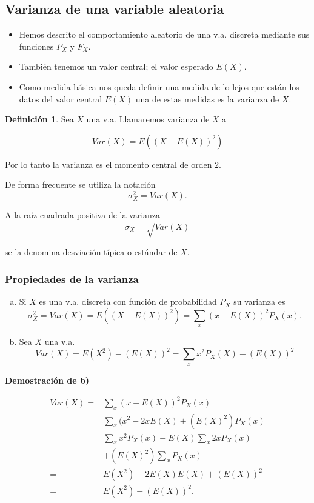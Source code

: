 \documentclass[handout]{beamer}\usepackage[]{graphicx}\usepackage[]{color}
\renewcommand{\emph}[1]{{\color{red}#1}}
\theoremstyle{plain}
\theoremstyle{definition}
\newtheorem{definicion}{Definición}
\begin{document}
\subsection{Varianza de una variable aleatoria}

\begin{frame}


\begin{itemize}
\item Hemos descrito el comportamiento aleatorio de una v.a. discreta mediante sus funciones  $P_{X}$ y
$F_{X}$.
\item También tenemos un valor central; el valor esperado $E(X)$. 
\item Como medida básica nos queda definir una medida de lo lejos que están los datos del valor central $E(X)$ una de estas medidas es la varianza de $X$.
\end{itemize}
\end{frame}

\begin{frame}
\begin{definicion}
    Sea $X$ una v.a. Llamaremos \emph{varianza} de $X$ a

    $$Var(X)=E((X-E(X))^2)$$
\end{definicion}

Por lo tanto la varianza es el momento
      central de orden $2$.

    De forma frecuente se utiliza la notación $$\sigma_{X}^2=Var(X).$$
    
    A la raíz cuadrada positiva de la varianza
   $$\sigma_{X}=\sqrt{Var(X)}$$
   
   se la denomina desviación típica  o estándar de $X$.
\end{frame}

\begin{frame}

\frametitle{Propiedades de la varianza}
\begin{enumerate}[a)]
\item Si $X$ es una v.a. discreta con función de probabilidad $P_X$ su varianza es 
 $$\sigma_{X}^2=Var(X)=E((X-E(X))^2)=\sum_{x}(x-E(X))^2 P_{X}(x).$$
\item Sea $X$ una v.a.
 $$Var(X)=E(X^2)-(E(X))^2=\sum_{x} x^2 P_{X}(X)-(E(X))^2$$
\end{enumerate}
\end{frame}

\begin{frame}
\textbf{Demostración de b)}

\begin{align*}
Var(X)= & \sum_{x}(x-E(X))^2 P_{X}(x)\\
=& \sum_{x}(x^2 -2 x E(X)+(E(X)^2) P_{X}(x)\\
=& \sum_{x}x^2P_{X}(x) -  E(X)\sum_{x}2 x P_{X}(x)\\
 &+(E(X)^2)\sum_{x} P_{X}(x)\\
=& E(X^2)- 2 E(X) E(X) + (E(X))^2\\
=& E(X^2)-(E(X))^2.
\end{align*}

\end{frame}
\end{document}

